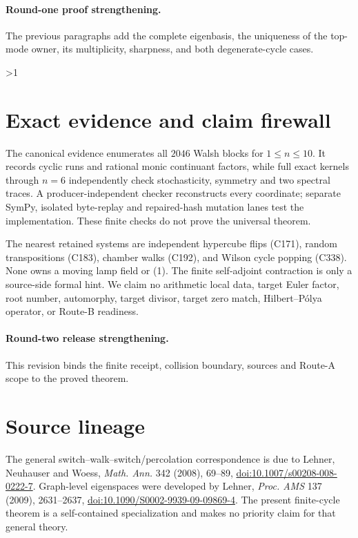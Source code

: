 \documentclass[10pt]{article}
\newcommand{\1}{\mathbf 1}
\providecommand{\CRevisionRound}{2}
\begin{document}
\paragraph{Round-one proof strengthening.}
The previous paragraphs add the complete eigenbasis, the uniqueness of the
top-mode owner, its multiplicity, sharpness, and both degenerate-cycle cases.
\fi

\ifnum\CRevisionRound>1
\section{Exact evidence and claim firewall}
The canonical evidence enumerates all $2046$ Walsh blocks for $1\le n\le10$.
It records cyclic runs and rational monic continuant factors, while full exact
kernels through $n=6$ independently check stochasticity, symmetry and two
spectral traces.  A producer-independent checker reconstructs every coordinate;
separate SymPy, isolated byte-replay and repaired-hash mutation lanes test the
implementation.  These finite checks do not prove the universal theorem.

The nearest retained systems are independent hypercube flips (C171), random
transpositions (C183), chamber walks (C192), and Wilson cycle popping (C338).
None owns a moving lamp field or (1).  The finite self-adjoint contraction is
only a source-side formal hint.  We claim no arithmetic local data, target
Euler factor, root number, automorphy, target divisor, target zero match,
Hilbert--P\'olya operator, or Route-B readiness.

\paragraph{Round-two release strengthening.}
This revision binds the finite receipt, collision boundary, sources and Route-A
scope to the proved theorem.
\fi

\section{Source lineage}
The general switch--walk--switch/percolation correspondence is due to Lehner,
Neuhauser and Woess, \emph{Math. Ann.} 342 (2008), 69--89,
\href{https://doi.org/10.1007/s00208-008-0222-7}{doi:10.1007/s00208-008-0222-7}.
Graph-level eigenspaces were developed by Lehner, \emph{Proc. AMS} 137 (2009),
2631--2637,
\href{https://doi.org/10.1090/S0002-9939-09-09869-4}{doi:10.1090/S0002-9939-09-09869-4}.
The present finite-cycle theorem is a self-contained specialization and makes
no priority claim for that general theory.
\end{document}
